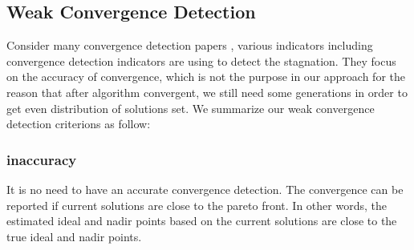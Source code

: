 \documentclass[conference]{IEEEtran}
\begin{document}
%
%
%
\subsection{Weak Convergence Detection}
Consider many convergence detection papers 
\cite{convergenceDetection:1, convergenceDetection:LSSC, convergenceDetection:OCD, 
convergenceDetection:OFCDandOCD, convergenceDetection:convergenceMetric, convergenceDetection:maxCD, 
convergenceDetection:online},
various indicators including convergence detection indicators are using to detect the stagnation.
They focus on the accuracy of convergence, which is not the purpose in our approach for 
the reason that after algorithm convergent, we still need some generations in order to
get even distribution of solutions set. 
We summarize our weak convergence detection criterions as follow:
\subsubsection{inaccuracy} It is no need to have an accurate convergence detection. 
The convergence can be reported if current solutions are close to the pareto front.
In other words, the estimated ideal and nadir points based on the current solutions
are close to the true ideal and nadir points. 
\end{document}
